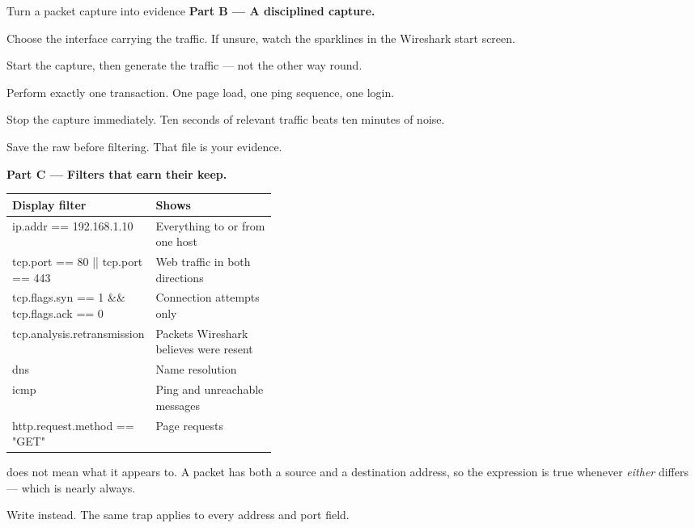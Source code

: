\begin{labproject}{Turn a packet capture into evidence}
\medskip\noindent\textbf{Part B --- A disciplined capture.}\par

\begin{netsteps}
  \item Choose the interface carrying the traffic. If unsure, watch the sparklines in the Wireshark start screen.
  \item Start the capture, then generate the traffic --- not the other way round.
  \item Perform exactly one transaction. One page load, one ping sequence, one login.
  \item Stop the capture immediately. Ten seconds of relevant traffic beats ten minutes of noise.
  \item Save the raw  before filtering. That file is your evidence.
\end{netsteps}

\medskip\noindent\textbf{Part C --- Filters that earn their keep.}\par

\begin{commandmap}
\begin{tabularx}{\linewidth}{@{}>{\ttfamily}p{0.38\linewidth}X@{}}
\toprule
\rowcolor{MLPaleBlue!92}
\textrm{\bfseries Display filter} & \bfseries Shows \\
\midrule
ip.addr == 192.168.1.10 & Everything to or from one host \\
tcp.port == 80 || tcp.port == 443 & Web traffic in both directions \\
tcp.flags.syn == 1 \&\& tcp.flags.ack == 0 & Connection attempts only \\
tcp.analysis.retransmission & Packets Wireshark believes were resent \\
dns & Name resolution \\
icmp & Ping and unreachable messages \\
http.request.method == "GET" & Page requests \\
\bottomrule
\end{tabularx}
\end{commandmap}

\begin{pitfall}
 does not mean what it appears to. A packet has both a source and a destination address, so the expression is true whenever \emph{either} differs --- which is nearly always.

Write  instead. The same trap applies to every address and port field.
\end{pitfall}


\end{labproject}
